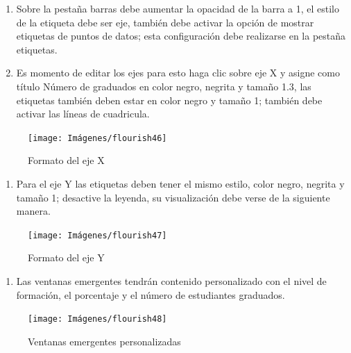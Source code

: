 \documentclass[
]{book}
\providecommand{\tightlist}{%
  \setlength{\itemsep}{0pt}\setlength{\parskip}{0pt}}
\begin{document}
\begin{enumerate}
\def\labelenumi{\arabic{enumi}.}
\setcounter{enumi}{4}
\item
  Sobre la pestaña barras debe aumentar la opacidad de la barra a 1, el estilo de la etiqueta debe ser eje, también debe activar la opción de mostrar etiquetas de puntos de datos; esta configuración debe realizarse en la pestaña etiquetas.
\item
  Es momento de editar los ejes para esto haga clic sobre eje X y asigne como título Número de graduados en color negro, negrita y tamaño 1.3, las etiquetas también deben estar en color negro y tamaño 1; también debe activar las líneas de cuadricula.
\end{enumerate}

\begin{figure}

{\centering \texttt{[image: Imágenes/flourish46]} 

}

\caption{Formato del eje X}\label{fig:paso6graficobarrasflourish-fig}
\end{figure}

\begin{enumerate}
\def\labelenumi{\arabic{enumi}.}
\setcounter{enumi}{6}
\tightlist
\item
  Para el eje Y las etiquetas deben tener el mismo estilo, color negro, negrita y tamaño 1; desactive la leyenda, su visualización debe verse de la siguiente manera.
\end{enumerate}

\begin{figure}

{\centering \texttt{[image: Imágenes/flourish47]} 

}

\caption{Formato del eje Y}\label{fig:paso7graficobarrasflourish-fig}
\end{figure}

\begin{enumerate}
\def\labelenumi{\arabic{enumi}.}
\setcounter{enumi}{7}
\tightlist
\item
  Las ventanas emergentes tendrán contenido personalizado con el nivel de formación, el porcentaje y el número de estudiantes graduados.
\end{enumerate}

\begin{figure}

{\centering \texttt{[image: Imágenes/flourish48]} 

}

\caption{Ventanas emergentes personalizadas}\label{fig:paso8graficobarrasflourish-fig}
\end{figure}
\end{document}
